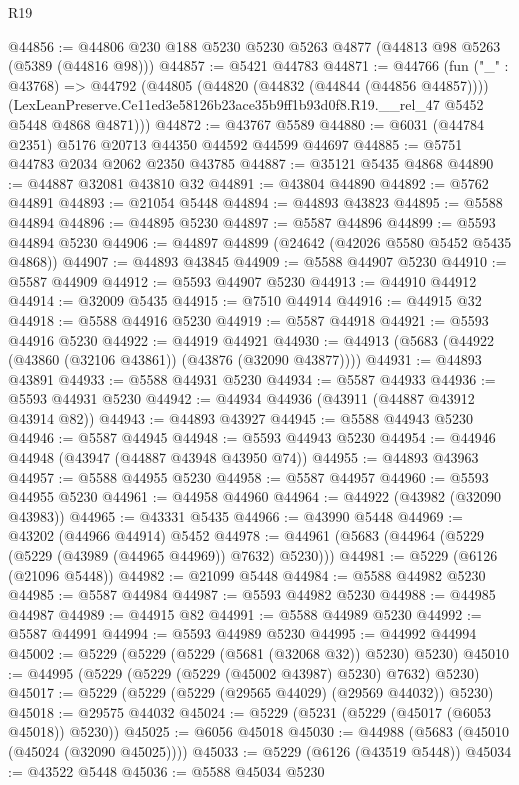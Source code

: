 \begin{lexlean}{R19}
\begin{coremodule}
@44856 := @44806 @230 @188 @5230 @5230 @5263 @4877 (@44813 @98 @5263 (@5389 (@44816 @98)))
@44857 := @5421 @44783
@44871 := @44766
    (fun ("_" : @43768) =>
    @44792
      (@44805
        (@44820 (@44832 (@44844 (@44856 @44857))))
        (LexLeanPreserve.Ce11ed3e58126b23ace35b9ff1b93d0f8.R19.__rel_47 @5452 @5448 @4868 @4871)))
@44872 := @43767 @5589
@44880 := @6031 (@44784 @2351) @5176 @20713 @44350 @44592 @44599 @44697
@44885 := @5751 @44783 @2034 @2062 @2350 @43785
@44887 := @35121 @5435 @4868
@44890 := @44887 @32081 @43810 @32
@44891 := @43804 @44890
@44892 := @5762 @44891
@44893 := @21054 @5448
@44894 := @44893 @43823
@44895 := @5588 @44894
@44896 := @44895 @5230
@44897 := @5587 @44896
@44899 := @5593 @44894 @5230
@44906 := @44897 @44899 (@24642 (@42026 @5580 @5452 @5435 @4868))
@44907 := @44893 @43845
@44909 := @5588 @44907 @5230
@44910 := @5587 @44909
@44912 := @5593 @44907 @5230
@44913 := @44910 @44912
@44914 := @32009 @5435
@44915 := @7510 @44914
@44916 := @44915 @32
@44918 := @5588 @44916 @5230
@44919 := @5587 @44918
@44921 := @5593 @44916 @5230
@44922 := @44919 @44921
@44930 := @44913 (@5683 (@44922 (@43860 (@32106 @43861)) (@43876 (@32090 @43877))))
@44931 := @44893 @43891
@44933 := @5588 @44931 @5230
@44934 := @5587 @44933
@44936 := @5593 @44931 @5230
@44942 := @44934 @44936 (@43911 (@44887 @43912 @43914 @82))
@44943 := @44893 @43927
@44945 := @5588 @44943 @5230
@44946 := @5587 @44945
@44948 := @5593 @44943 @5230
@44954 := @44946 @44948 (@43947 (@44887 @43948 @43950 @74))
@44955 := @44893 @43963
@44957 := @5588 @44955 @5230
@44958 := @5587 @44957
@44960 := @5593 @44955 @5230
@44961 := @44958 @44960
@44964 := @44922 (@43982 (@32090 @43983))
@44965 := @43331 @5435
@44966 := @43990 @5448
@44969 := @43202 (@44966 @44914) @5452
@44978 := @44961 (@5683 (@44964 (@5229 (@5229 (@43989 (@44965 @44969)) @7632) @5230)))
@44981 := @5229 (@6126 (@21096 @5448))
@44982 := @21099 @5448
@44984 := @5588 @44982 @5230
@44985 := @5587 @44984
@44987 := @5593 @44982 @5230
@44988 := @44985 @44987
@44989 := @44915 @82
@44991 := @5588 @44989 @5230
@44992 := @5587 @44991
@44994 := @5593 @44989 @5230
@44995 := @44992 @44994
@45002 := @5229 (@5229 (@5229 (@5681 (@32068 @32)) @5230) @5230)
@45010 := @44995 (@5229 (@5229 (@5229 (@45002 @43987) @5230) @7632) @5230)
@45017 := @5229 (@5229 (@5229 (@29565 @44029) (@29569 @44032)) @5230)
@45018 := @29575 @44032
@45024 := @5229 (@5231 (@5229 (@45017 (@6053 @45018)) @5230))
@45025 := @6056 @45018
@45030 := @44988 (@5683 (@45010 (@45024 (@32090 @45025))))
@45033 := @5229 (@6126 (@43519 @5448))
@45034 := @43522 @5448
@45036 := @5588 @45034 @5230

\end{coremodule}
\end{lexlean}
